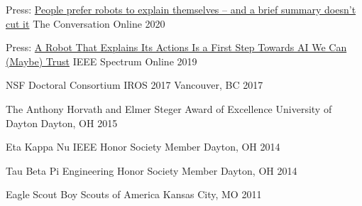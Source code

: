 




\begin{cvhonors}


\cvhonor
{Press: \href{https://theconversation.com/people-prefer-robots-to-explain-themselves-and-a-brief-summary-doesnt-cut-it-129431}{People prefer robots to explain themselves – and a brief summary doesn’t cut it}} %
{The Conversation} %
{Online} %
{2020} %


\cvhonor
{Press: \href{https://spectrum.ieee.org/automaton/robotics/artificial-intelligence/a-robot-that-explains-its-actions}{A Robot That Explains Its Actions Is a First Step Towards AI We Can (Maybe) Trust}} %
{IEEE Spectrum} %
{Online} %
{2019} %


\cvhonor
{NSF Doctoral Consortium} %
{IROS 2017} %
{Vancouver, BC} %
{2017} %


\cvhonor
{The Anthony Horvath and Elmer Steger Award of Excellence} %
{University of Dayton} %
{Dayton, OH} %
{2015} %


\cvhonor
{Eta Kappa Nu IEEE Honor Society} %
{Member} %
{Dayton, OH} %
{2014} %


\cvhonor
{Tau Beta Pi Engineering Honor Society} %
{Member} %
{Dayton, OH} %
{2014} %


\cvhonor
{Eagle Scout} %
{Boy Scouts of America} %
{Kansas City, MO} %
{2011} %


\end{cvhonors}